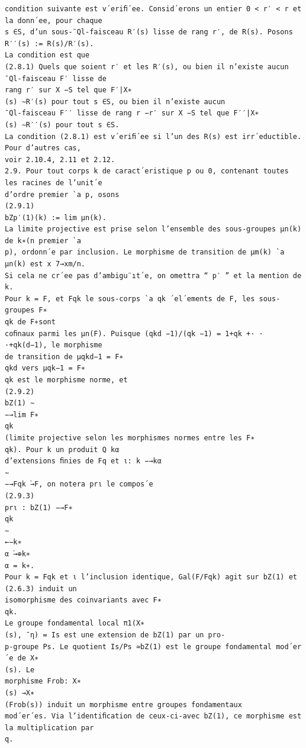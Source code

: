 \documentclass[11pt]{article}
\begin{document}
\begin{Verbatim}[breaklines=true,fontsize=\small]
condition suivante est v´eriﬁ´ee. Consid´erons un entier 0 < r′ < r et la donn´ee, pour chaque
s ∈S, d’un sous-¯Ql-faisceau R′(s) lisse de rang r′, de R(s). Posons R′′(s) := R(s)/R′(s).
La condition est que
(2.8.1) Quels que soient r′ et les R′(s), ou bien il n’existe aucun ¯Ql-faisceau F′ lisse de
rang r′ sur X −S tel que F′|X∗
(s) ∼R′(s) pour tout s ∈S, ou bien il n’existe aucun
¯Ql-faisceau F′′ lisse de rang r −r′ sur X −S tel que F′′|X∗
(s) ∼R′′(s) pour tout s ∈S.
La condition (2.8.1) est v´eriﬁ´ee si l’un des R(s) est irr´eductible. Pour d’autres cas,
voir 2.10.4, 2.11 et 2.12.
2.9. Pour tout corps k de caract´eristique p ou 0, contenant toutes les racines de l’unit´e
d’ordre premier `a p, osons
(2.9.1)
bZp′(1)(k) := lim µn(k).
La limite projective est prise selon l’ensemble des sous-groupes µn(k) de k∗(n premier `a
p), ordonn´e par inclusion. Le morphisme de transition de µm(k) `a µn(k) est x 7→xm/n.
Si cela ne cr´ee pas d’ambigu¨ıt´e, on omettra “ p′ ” et la mention de k.
Pour k = F, et Fqk le sous-corps `a qk ´el´ements de F, les sous-groupes F∗
qk de F∗sont
coﬁnaux parmi les µn(F). Puisque (qkd −1)/(qk −1) = 1+qk +· · ·+qk(d−1), le morphisme
de transition de µqkd−1 = F∗
qkd vers µqk−1 = F∗
qk est le morphisme norme, et
(2.9.2)
bZ(1) ∼
−→lim F∗
qk
(limite projective selon les morphismes normes entre les F∗
qk). Pour k un produit Q kα
d’extensions ﬁnies de Fq et ι: k −→kα
∼
−→Fqk ֒→F, on notera prι le compos´e
(2.9.3)
prι : bZ(1) −→F∗
qk
∼
←−k∗
α ֒→⊕k∗
α = k∗.
Pour k = Fqk et ι l’inclusion identique, Gal(F/Fqk) agit sur bZ(1) et (2.6.3) induit un
isomorphisme des coinvariants avec F∗
qk.
Le groupe fondamental local π1(X∗
(s), ¯η) = Is est une extension de bZ(1) par un pro-
p-groupe Ps. Le quotient Is/Ps ≃bZ(1) est le groupe fondamental mod´er´e de X∗
(s). Le
morphisme Frob: X∗
(s) →X∗
(Frob(s)) induit un morphisme entre groupes fondamentaux
mod´er´es. Via l’identiﬁcation de ceux-ci-avec bZ(1), ce morphisme est la multiplication par
q.


\end{Verbatim}
\end{document}
